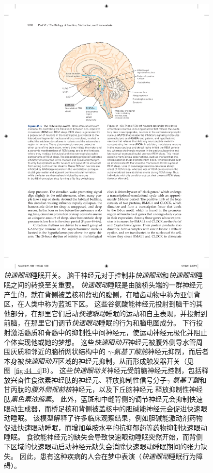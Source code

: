 \begin{figure}[htbp]
	\centering
	\includegraphics[width=0.82\linewidth]{chap44/fig_44_5}
	\caption{\textit{快速眼动}睡眠开关。 脑干神经元对于控制非\textit{快速眼动}和\textit{快速眼动}睡眠之间的转换至关重要。
		\textit{快速眼动}睡眠是由脑桥头端的一群神经元产生的，就在背侧被盖核和蓝斑的腹侧，在啮齿动物中称为亚侧背区，在人类中称为蓝斑下区。
		这些谷氨酸能神经元投射到脑干的其他部分，在那里它们启动\textit{快速眼动}睡眠的运动和自主表现，并投射到前脑，在那里它们调节\textit{快速眼动}睡眠的行为和脑电图成分。
		下行投射激活髓质和脊髓中的抑制性中间神经元，使运动神经元极化并阻止个体实现他或她的梦想。
		这些\textit{快速眼动开}神经元被腹外侧导水管周围灰质和邻近的脑桥网状结构中的 \textit{$\gamma$-氨基丁酸能}神经元抑制，而后者本身被\textit{快速眼动开}区域的神经元抑制，从而形成触发器开关（见图~\ref{fig:44_4}B）。
		这些\textit{快速眼动关}神经元受前脑神经元控制，包括释放兴奋性食欲素神经肽的神经元、释放抑制性信号分子\textit{$\gamma$-氨基丁酸}和甘丙肽的\textit{腹外侧视前核}神经元，以及下丘脑神经元 释放抑制性神经肽\textit{黑色素浓缩素}。
		此外，蓝斑和中缝背侧的调节神经元会抑制快速眼动生成器，而桥足核和背侧被盖核中的胆碱能神经元会促进快速眼动睡眠。
		该模型解释了许多临床观察结果，例如胆碱能激动剂药物促进快速眼动睡眠，而增加单胺水平的抗抑郁药等药物抑制快速眼动睡眠。
		食欲能神经元的缺失会导致快速眼动睡眠突然开始，而背侧下区域的快速眼动启动神经元缺失会消除快速眼动睡眠期间的张力缺失。
		因此，患有这种疾病的人会在梦中表演（\textit{快速眼动}睡眠行为障碍）。}
	\label{fig:44_5}
\end{figure}


